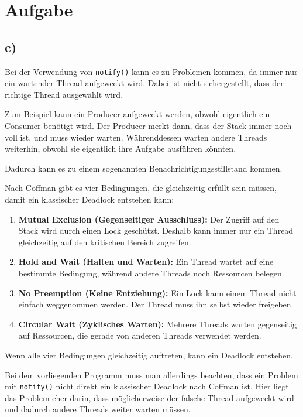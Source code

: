 \documentclass[a4paper,11pt]{article}
\begin{document}
	
	\fancyhf{}
	
	\section{Aufgabe}
	\subsection*{c)}
	
	Bei der Verwendung von \texttt{notify()} kann es zu Problemen kommen, da immer nur ein wartender Thread aufgeweckt wird. Dabei ist nicht sichergestellt, dass der richtige Thread ausgewählt wird.
	
	Zum Beispiel kann ein Producer aufgeweckt werden, obwohl eigentlich ein Consumer benötigt wird. Der Producer merkt dann, dass der Stack immer noch voll ist, und muss wieder warten. Währenddessen warten andere Threads weiterhin, obwohl sie eigentlich ihre Aufgabe ausführen könnten.
	
	Dadurch kann es zu einem sogenannten Benachrichtigungsstillstand kommen.
	
	Nach Coffman gibt es vier Bedingungen, die gleichzeitig erfüllt sein müssen, damit ein klassischer Deadlock entstehen kann:
	
	\begin{enumerate}
		\item \textbf{Mutual Exclusion (Gegenseitiger Ausschluss):}
		Der Zugriff auf den Stack wird durch einen Lock geschützt. Deshalb kann immer nur ein Thread gleichzeitig auf den kritischen Bereich zugreifen.
		
		\item \textbf{Hold and Wait (Halten und Warten):}
		Ein Thread wartet auf eine bestimmte Bedingung, während andere Threads noch Ressourcen belegen.
		
		\item \textbf{No Preemption (Keine Entziehung):}
		Ein Lock kann einem Thread nicht einfach weggenommen werden. Der Thread muss ihn selbst wieder freigeben.
		
		\item \textbf{Circular Wait (Zyklisches Warten):}
		Mehrere Threads warten gegenseitig auf Ressourcen, die gerade von anderen Threads verwendet werden.
	\end{enumerate}
	
	Wenn alle vier Bedingungen gleichzeitig auftreten, kann ein Deadlock entstehen.
	
	Bei dem vorliegenden Programm muss man allerdings beachten, dass ein Problem mit \texttt{notify()} nicht direkt ein klassischer Deadlock nach Coffman ist. Hier liegt das Problem eher darin, dass möglicherweise der falsche Thread aufgeweckt wird und dadurch andere Threads weiter warten müssen.
	
\end{document}
